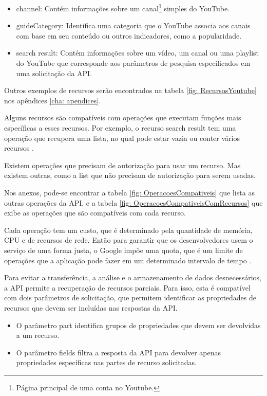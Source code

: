 \begin{itemize}
  \item channel: Contém informações sobre um canal\footnote{ Página principal de uma conta no Youtube.} simples do YouTube.
  \item guideCategory: Identifica uma categoria que o YouTube associa aos canais com base em seu conteúdo ou outros indicadores, como a popularidade.
  \item search result: Contém informações sobre um vídeo, um canal ou uma playlist do YouTube que corresponde aos parâmetros de pesquisa especificados em uma solicitação da API.
\end{itemize}

Outros exemplos de recursos serão encontrados na tabela \ref{fig: RecursosYoutube} nos apêndices \ref{cha: apendices}.

Alguns recursos são compatíveis com operações que executam funções mais específicas a esses recursos. Por exemplo, o recurso search result tem uma operação que recupera uma lista, no qual pode estar vazia ou conter vários recursos \cite{GettingStartedYoutubeAPI}.

Existem operações que precisam de autorização para usar um recurso. Mas existem outras, como a list que não precisam de autorização para serem usadas. 

Nos anexos, pode-se encontrar a tabela \ref{fig: OperacoesCompativeis} que lista as outras operações da API, e a tabela \ref{fig: OperacoesCompativeisComRecursos} que exibe as operações que são compatíveis com cada recurso.

Cada operação tem um custo, que é determinado pela quantidade de memória, CPU e de recursos de rede. Então para garantir que os desenvolvedores usem o serviço de uma forma justa, o Google impõe uma quota, que é um limite de operações que a aplicação pode fazer em um determinado intervalo de tempo \cite{GettingStartedYoutubeAPI}.

Para evitar a transferência, a análise e o armazenamento de dados desnecessários, a API permite a recuperação de recursos parciais. Para isso, esta é compatível com dois parâmetros de solicitação, que permitem identificar as propriedades de recursos que devem ser incluídas nas respostas da API.

\begin{itemize}
	\item O parâmetro part identifica grupos de propriedades que devem ser devolvidas a um recurso. 
	\item O parâmetro fields filtra a resposta da API para devolver apenas propriedades específicas nas partes de recurso solicitadas.
\end{itemize}

